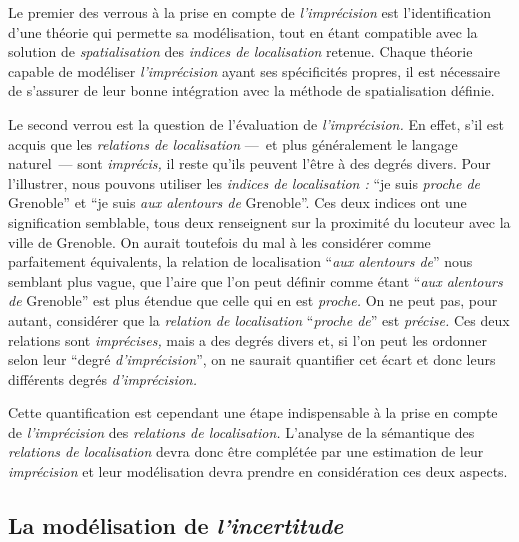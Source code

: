 Le premier des verrous à la prise en compte de \emph{l'imprécision}
est l'identification d'une théorie qui permette sa modélisation, tout
en étant compatible avec la solution de \emph{spatialisation} des
\emph{indices de localisation} retenue. Chaque théorie capable de
modéliser \emph{l'imprécision} ayant ses spécificités propres, il est
nécessaire de s'assurer de leur bonne intégration avec la méthode de
spatialisation définie.

Le second verrou est la question de l'évaluation de
\emph{l'imprécision.} En effet, s'il est acquis que les
\emph{relations de localisation} ---~et plus généralement le langage
naturel~--- sont \emph{imprécis,} il reste qu'ils peuvent l'être à des
degrés divers. Pour l'illustrer, nous pouvons utiliser les
\emph{indices de localisation :} \enquote{je suis \emph{proche de}
  Grenoble} et \enquote{je suis \emph{aux alentours de} Grenoble}. Ces
deux indices ont une signification semblable, tous deux renseignent
sur la proximité du locuteur avec la ville de Grenoble. On aurait
toutefois du mal à les considérer comme parfaitement équivalents, la
relation de localisation \enquote{\emph{aux alentours de}} nous
semblant plus vague, \ie que l'aire que l'on peut définir comme étant
\enquote{\emph{aux alentours de} Grenoble} est plus étendue que celle
qui en est \emph{proche.} On ne peut pas, pour autant, considérer que
la \emph{relation de localisation} \enquote{\emph{proche de}} est
\emph{précise.} Ces deux relations sont \emph{imprécises,} mais a des
degrés divers et, si l'on peut les ordonner selon leur \enquote{degré
  \emph{d'imprécision}}, on ne saurait quantifier cet écart et donc
leurs différents degrés \emph{d'imprécision.}

Cette quantification est cependant une étape indispensable à la prise
en compte de \emph{l'imprécision} des \emph{relations de
  localisation.} L'analyse de la sémantique des \emph{relations de
  localisation} devra donc être complétée par une estimation de leur
\emph{imprécision} et leur modélisation devra prendre en considération
ces deux aspects.

\subsection{La modélisation de \emph{l'incertitude}}
\label{subsec:2-1-3}

